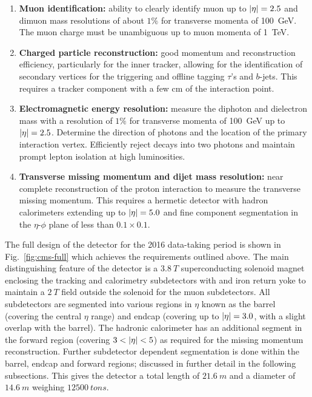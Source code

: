 \begin{enumerate}
    \item \textbf{Muon identification:} ability to clearly
    identify muon up to $|\eta|=2.5$ and dimuon mass resolutions of about $1\%$ for transverse momenta of \SI{100}{GeV}. The muon charge must be unambiguous up to
    muon momenta of \SI{1}{TeV}.
    \item \textbf{Charged particle reconstruction:} good momentum and reconstruction
    efficiency, particularly for the inner tracker, allowing for the identification
    of secondary vertices for the triggering and offline tagging $\tau$'s and
    $b$-jets. This requires a tracker component with a few cm of the interaction
    point.
    \item \textbf{Electromagnetic energy resolution:} measure the diphoton and
    dielectron mass with a resolution of $1\%$ for transverse momenta of
    \SI{100}{GeV} up to $|\eta|=2.5$. Determine the direction of photons and the
    location of the primary interaction vertex. Efficiently reject \Ppizero decays
    into two photons and maintain prompt lepton isolation at high luminosities.
    \item \textbf{Transverse missing momentum and dijet mass resolution:} near
    complete reconstruction of the proton interaction to measure the transverse
    missing momentum. This requires a hermetic detector with hadron calorimeters
    extending up to $|\eta|=5.0$ and fine component segmentation in the $\eta$-$\phi$
    plane of less than $0.1\times 0.1$.
\end{enumerate}

The full design of the \CMS detector for the 2016 data-taking period is shown in
Fig.~\ref{fig:cms-full} which achieves the requirements outlined above. The main
distinguishing feature of the \CMS detector is a ${\SI{3.8}{T}}$ superconducting
solenoid magnet enclosing the tracking and calorimetry subdetectors with and iron
return yoke to maintain a ${\SI{2}{T}}$ field outside the solenoid for the muon
subdetectors. All subdetectors are segmented into various regions in $\eta$ known
as the barrel (covering the central $\eta$ range) and endcap (covering up to
$|\eta|=3.0$, with a slight overlap with the barrel). The hadronic calorimeter has an
additional segment in the forward region (covering $3<\aeta<5$) as required for
the missing momentum reconstruction. Further subdetector dependent segmentation is
done within the barrel, endcap and forward regions; discussed in further detail in
the following subsections. This gives the \CMS detector a total length of
${\SI{21.6}{m}}$ and a diameter of ${\SI{14.6}{m}}$ weighing ${\SI{12500}{tons}}$.

